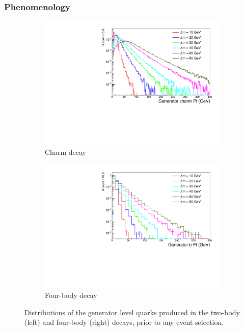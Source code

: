 \subsubsection{Phenomenology}

\begin{figure}[h!]
  \centering
  \begin{subfigure}[b]{0.46\textwidth}
    \includegraphics[width=\textwidth]{Figs/genlevel/compar_charmPt_0_0_inc_inc_T2cc_noCuts_sitv_log.pdf}
    \caption{Charm decay}
    \label{fig:t2cc_gen_charm_pt}
  \end{subfigure}
  \begin{subfigure}[b]{0.46\textwidth}
    \includegraphics[width=\textwidth]{Figs/genlevel/compar_T2_4body_genBPt_0_inc_inc_T2_noCuts_sitv_log.pdf}
    \caption{Four-body decay}
    \label{fig:t2degen_gen_b_pt}
  \end{subfigure}
  \caption{Distributions of the generator level quarks produced in the two-body
  (left) and four-body (right) decays, prior to any event selection.}
  \label{fig:gen_quark_pt}
\end{figure}

